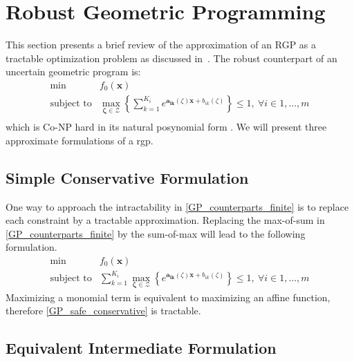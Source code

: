\section{Robust Geometric Programming} \label{RGP}

This section presents a brief review of the approximation of an RGP as a
tractable optimization problem as discussed in~\cite{Saab2018}.
The robust counterpart of an uncertain geometric program is:
\begin{equation}
    \begin{split}
        \min &f_0\left(\mathbf{x}\right)\\
        \text{subject to} &\max_{\mathbf{\zeta} \in \mathcal{Z}} \left\{\textstyle{\sum}_{k=1}^{K_i}e^{\mathbf{a_{ik}}\left(\zeta\right)\mathbf{x} + b_{ik}\left(\zeta\right)}\right\} \leq 1, ~\forall i \in 1,...,m\\
    \end{split}
    \label{GP_counterparts_finite}
\end{equation}
which is Co-NP hard in its natural posynomial form \cite{RGPcoNP}. We will present three approximate formulations of a \gls{rgp}.

\subsection{Simple Conservative Formulation}
One way to approach the intractability in \eqref{GP_counterparts_finite} is to replace each constraint by a tractable approximation.
Replacing the max-of-sum in \eqref{GP_counterparts_finite} by the sum-of-max will lead to the following formulation.
\begin{equation}
    \begin{split}
        \min &f_0\left(\mathbf{x}\right)\\
        \text{subject to} &\textstyle{\sum}_{k=1}^{K_i} {\displaystyle \max_{\mathbf{\zeta} \in \mathcal{Z}}} \left\{e^{\mathbf{a_{ik}}\left(\zeta\right)\mathbf{x} + b_{ik}\left(\zeta\right)}\right\} \leq 1, ~\forall i \in 1,...,m
    \end{split}
    \label{GP_safe_conservative}
\end{equation}
Maximizing a monomial term is equivalent to maximizing an affine function, therefore \eqref{GP_safe_conservative} is tractable.

\subsection{Equivalent Intermediate Formulation}

